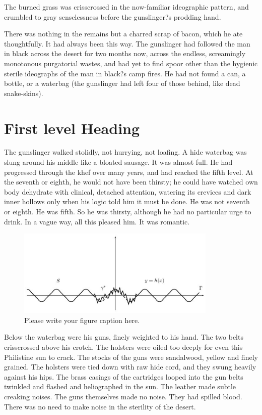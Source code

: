 \documentclass[
11pt,%
tightenlines,%
twoside,%
onecolumn,%
nofloats,%
nobibnotes,%
nofootinbib,%
superscriptaddress,%
noshowpacs,%
centertags]%
{revtex4}
\begin{document}
The burned grass was crisscrossed in the now-familiar ideographic pattern, and crumbled to gray senselessness before the gunslinger?s prodding hand. 

There was nothing in the remains but a charred scrap of bacon, which he ate thoughtfully. It had always been this way. The gunslinger had followed the man in black across the desert for two months now, across the endless, screamingly monotonous purgatorial wastes, and had yet to find spoor other than the hygienic sterile ideographs of the man in black?s camp fires. He had not found a can, a bottle, or a waterbag (the gunslinger had left four of those behind, like dead snake-skins).

\section{First level Heading}

The gunslinger walked stolidly, not hurrying, not loafing. A hide waterbag was slung around his middle like a bloated sausage. It was almost full. He had progressed through the khef over many years, and had reached the fifth level. At the seventh or eighth, he would not have been thirsty; he could have watched own body dehydrate with clinical, detached attention, watering its crevices and dark inner hollows only when his logic told him it must be done. He was not seventh or eighth. He was fifth. So he was thirsty, although he had no particular urge to drink. In a vague way, all this pleased him. It was romantic.

\begin{figure}[h]
\setcaptionmargin{5mm}
\onelinecaptionstrue  %
\includegraphics[width=0.85\textwidth]{deform.eps}
\caption{Please write your figure caption here.}\label{fig:1}
\end{figure}

Below the waterbag were his guns, finely weighted to his hand. The two belts crisscrossed above his crotch. The holsters were oiled too deeply for even this Philistine sun to crack. The stocks of the guns were sandalwood, yellow and finely grained. The holsters were tied down with raw hide cord, and they swung heavily against his hips. The brass casings of the cartridges looped into the gun belts twinkled and flashed and heliographed in the sun. The leather made subtle creaking noises. The guns themselves made no noise. They had spilled blood. There was no need to make noise in the sterility of the desert.
\end{document}
